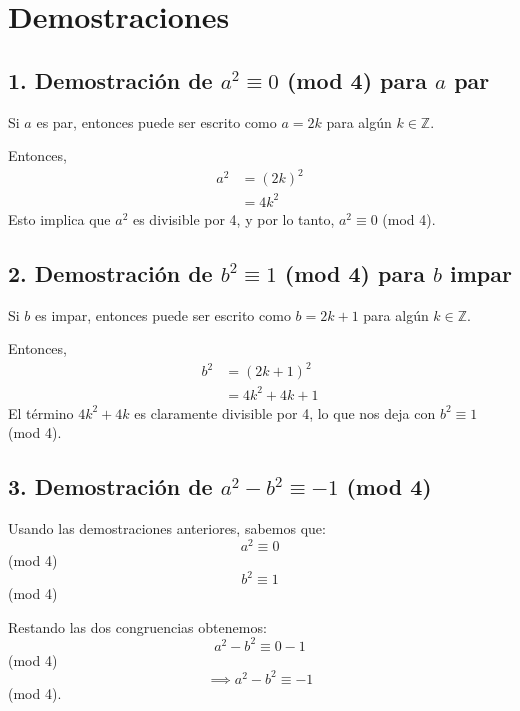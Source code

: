 \documentclass{article}
\begin{document}
\section*{Demostraciones}

\subsection*{1. Demostración de \(a^2 \equiv 0 \) (mod 4) para \( a \) par}
Si \( a \) es par, entonces puede ser escrito como \( a = 2k \) para algún \( k \in \mathbb{Z} \).

Entonces,
\begin{align*}
a^2 &= (2k)^2 \\
&= 4k^2
\end{align*}
Esto implica que \( a^2 \) es divisible por 4, y por lo tanto, \( a^2 \equiv 0 \) (mod 4).

\subsection*{2. Demostración de \(b^2 \equiv 1 \) (mod 4) para \( b \) impar}
Si \( b \) es impar, entonces puede ser escrito como \( b = 2k + 1 \) para algún \( k \in \mathbb{Z} \).

Entonces,
\begin{align*}
b^2 &= (2k + 1)^2 \\
&= 4k^2 + 4k + 1
\end{align*}
El término \( 4k^2 + 4k \) es claramente divisible por 4, lo que nos deja con \( b^2 \equiv 1 \) (mod 4).

\subsection*{3. Demostración de \(a^2 - b^2 \equiv -1 \) (mod 4)}
Usando las demostraciones anteriores, sabemos que:
\[ a^2 \equiv 0 \] (mod 4) \\
\[ b^2 \equiv 1 \] (mod 4)

Restando las dos congruencias obtenemos:
\[ a^2 - b^2 \equiv 0 - 1 \] (mod 4)
\[ \implies a^2 - b^2 \equiv -1 \] (mod 4).
\end{document}

